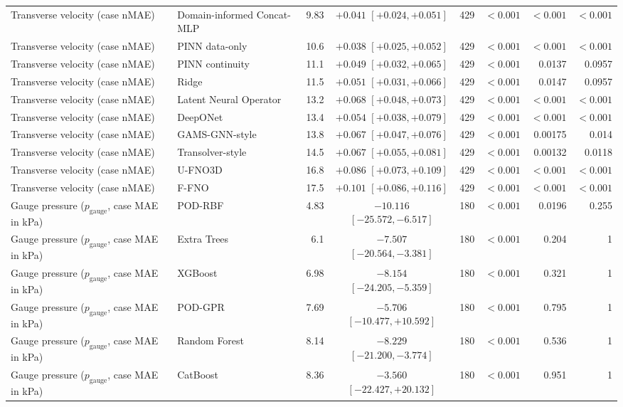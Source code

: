 \begin{landscape}
\begin{longtable}{p{4.0cm}p{3.4cm}rcrrrr}
Transverse velocity (case nMAE) & Domain-informed Concat-MLP & 9.83 & $+0.041$ $[+0.024, +0.051]$ & 429 & $< 0.001$ & $< 0.001$ & $< 0.001$ \\
Transverse velocity (case nMAE) & PINN data-only & 10.6 & $+0.038$ $[+0.025, +0.052]$ & 429 & $< 0.001$ & $< 0.001$ & $< 0.001$ \\
Transverse velocity (case nMAE) & PINN continuity & 11.1 & $+0.049$ $[+0.032, +0.065]$ & 429 & $< 0.001$ & 0.0137 & 0.0957 \\
Transverse velocity (case nMAE) & Ridge & 11.5 & $+0.051$ $[+0.031, +0.066]$ & 429 & $< 0.001$ & 0.0147 & 0.0957 \\
Transverse velocity (case nMAE) & Latent Neural Operator & 13.2 & $+0.068$ $[+0.048, +0.073]$ & 429 & $< 0.001$ & $< 0.001$ & $< 0.001$ \\
Transverse velocity (case nMAE) & DeepONet & 13.4 & $+0.054$ $[+0.038, +0.079]$ & 429 & $< 0.001$ & $< 0.001$ & $< 0.001$ \\
Transverse velocity (case nMAE) & GAMS-GNN-style & 13.8 & $+0.067$ $[+0.047, +0.076]$ & 429 & $< 0.001$ & 0.00175 & 0.014 \\
Transverse velocity (case nMAE) & Transolver-style & 14.5 & $+0.067$ $[+0.055, +0.081]$ & 429 & $< 0.001$ & 0.00132 & 0.0118 \\
Transverse velocity (case nMAE) & U-FNO3D & 16.8 & $+0.086$ $[+0.073, +0.109]$ & 429 & $< 0.001$ & $< 0.001$ & $< 0.001$ \\
Transverse velocity (case nMAE) & F-FNO & 17.5 & $+0.101$ $[+0.086, +0.116]$ & 429 & $< 0.001$ & $< 0.001$ & $< 0.001$ \\
Gauge pressure ($p_{\mathrm{gauge}}$, case MAE in kPa) & POD-RBF & 4.83 & $-10.116$ $[-25.572, -6.517]$ & 180 & $< 0.001$ & 0.0196 & 0.255 \\
Gauge pressure ($p_{\mathrm{gauge}}$, case MAE in kPa) & Extra Trees & 6.1 & $-7.507$ $[-20.564, -3.381]$ & 180 & $< 0.001$ & 0.204 & 1 \\
Gauge pressure ($p_{\mathrm{gauge}}$, case MAE in kPa) & XGBoost & 6.98 & $-8.154$ $[-24.205, -5.359]$ & 180 & $< 0.001$ & 0.321 & 1 \\
Gauge pressure ($p_{\mathrm{gauge}}$, case MAE in kPa) & POD-GPR & 7.69 & $-5.706$ $[-10.477, +10.592]$ & 180 & $< 0.001$ & 0.795 & 1 \\
Gauge pressure ($p_{\mathrm{gauge}}$, case MAE in kPa) & Random Forest & 8.14 & $-8.229$ $[-21.200, -3.774]$ & 180 & $< 0.001$ & 0.536 & 1 \\
Gauge pressure ($p_{\mathrm{gauge}}$, case MAE in kPa) & CatBoost & 8.36 & $-3.560$ $[-22.427, +20.132]$ & 180 & $< 0.001$ & 0.951 & 1 \\

\end{longtable}
\end{landscape}
